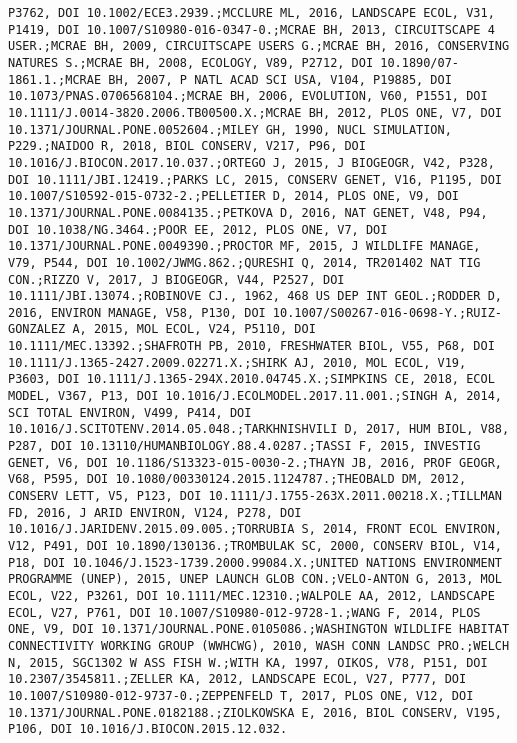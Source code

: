 \documentclass[]{article}
\begin{document}
\begin{verbatim}
P3762, DOI 10.1002/ECE3.2939.;MCCLURE ML, 2016, LANDSCAPE ECOL, V31, P1419, DOI 10.1007/S10980-016-0347-0.;MCRAE BH, 2013, CIRCUITSCAPE 4 USER.;MCRAE BH, 2009, CIRCUITSCAPE USERS G.;MCRAE BH, 2016, CONSERVING NATURES S.;MCRAE BH, 2008, ECOLOGY, V89, P2712, DOI 10.1890/07-1861.1.;MCRAE BH, 2007, P NATL ACAD SCI USA, V104, P19885, DOI 10.1073/PNAS.0706568104.;MCRAE BH, 2006, EVOLUTION, V60, P1551, DOI 10.1111/J.0014-3820.2006.TB00500.X.;MCRAE BH, 2012, PLOS ONE, V7, DOI 10.1371/JOURNAL.PONE.0052604.;MILEY GH, 1990, NUCL SIMULATION, P229.;NAIDOO R, 2018, BIOL CONSERV, V217, P96, DOI 10.1016/J.BIOCON.2017.10.037.;ORTEGO J, 2015, J BIOGEOGR, V42, P328, DOI 10.1111/JBI.12419.;PARKS LC, 2015, CONSERV GENET, V16, P1195, DOI 10.1007/S10592-015-0732-2.;PELLETIER D, 2014, PLOS ONE, V9, DOI 10.1371/JOURNAL.PONE.0084135.;PETKOVA D, 2016, NAT GENET, V48, P94, DOI 10.1038/NG.3464.;POOR EE, 2012, PLOS ONE, V7, DOI 10.1371/JOURNAL.PONE.0049390.;PROCTOR MF, 2015, J WILDLIFE MANAGE, V79, P544, DOI 10.1002/JWMG.862.;QURESHI Q, 2014, TR201402 NAT TIG CON.;RIZZO V, 2017, J BIOGEOGR, V44, P2527, DOI 10.1111/JBI.13074.;ROBINOVE CJ., 1962, 468 US DEP INT GEOL.;RODDER D, 2016, ENVIRON MANAGE, V58, P130, DOI 10.1007/S00267-016-0698-Y.;RUIZ-GONZALEZ A, 2015, MOL ECOL, V24, P5110, DOI 10.1111/MEC.13392.;SHAFROTH PB, 2010, FRESHWATER BIOL, V55, P68, DOI 10.1111/J.1365-2427.2009.02271.X.;SHIRK AJ, 2010, MOL ECOL, V19, P3603, DOI 10.1111/J.1365-294X.2010.04745.X.;SIMPKINS CE, 2018, ECOL MODEL, V367, P13, DOI 10.1016/J.ECOLMODEL.2017.11.001.;SINGH A, 2014, SCI TOTAL ENVIRON, V499, P414, DOI 10.1016/J.SCITOTENV.2014.05.048.;TARKHNISHVILI D, 2017, HUM BIOL, V88, P287, DOI 10.13110/HUMANBIOLOGY.88.4.0287.;TASSI F, 2015, INVESTIG GENET, V6, DOI 10.1186/S13323-015-0030-2.;THAYN JB, 2016, PROF GEOGR, V68, P595, DOI 10.1080/00330124.2015.1124787.;THEOBALD DM, 2012, CONSERV LETT, V5, P123, DOI 10.1111/J.1755-263X.2011.00218.X.;TILLMAN FD, 2016, J ARID ENVIRON, V124, P278, DOI 10.1016/J.JARIDENV.2015.09.005.;TORRUBIA S, 2014, FRONT ECOL ENVIRON, V12, P491, DOI 10.1890/130136.;TROMBULAK SC, 2000, CONSERV BIOL, V14, P18, DOI 10.1046/J.1523-1739.2000.99084.X.;UNITED NATIONS ENVIRONMENT PROGRAMME (UNEP), 2015, UNEP LAUNCH GLOB CON.;VELO-ANTON G, 2013, MOL ECOL, V22, P3261, DOI 10.1111/MEC.12310.;WALPOLE AA, 2012, LANDSCAPE ECOL, V27, P761, DOI 10.1007/S10980-012-9728-1.;WANG F, 2014, PLOS ONE, V9, DOI 10.1371/JOURNAL.PONE.0105086.;WASHINGTON WILDLIFE HABITAT CONNECTIVITY WORKING GROUP (WWHCWG), 2010, WASH CONN LANDSC PRO.;WELCH N, 2015, SGC1302 W ASS FISH W.;WITH KA, 1997, OIKOS, V78, P151, DOI 10.2307/3545811.;ZELLER KA, 2012, LANDSCAPE ECOL, V27, P777, DOI 10.1007/S10980-012-9737-0.;ZEPPENFELD T, 2017, PLOS ONE, V12, DOI 10.1371/JOURNAL.PONE.0182188.;ZIOLKOWSKA E, 2016, BIOL CONSERV, V195, P106, DOI 10.1016/J.BIOCON.2015.12.032.

\end{verbatim}
\end{document}
